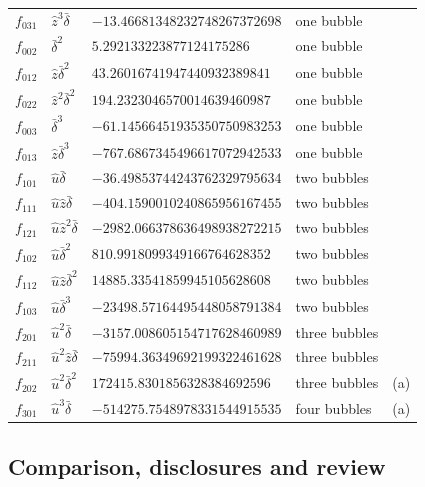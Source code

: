 \documentclass[11pt,a4paper]{article}
\numberwithin{equation}{section}
\newcommand{\db}{\bar\delta}
\begin{document}
{\begin{longtable}{@{}lllll@{}}
$f_{031}$ & $\hat z^3\db$ & $-13.46681348232748267372698$ & one bubble & \\
$f_{002}$ & $\db^2$ & $5.292133223877124175286$ & one bubble & \\
$f_{012}$ & $\hat z\db^2$ & $43.26016741947440932389841$ & one bubble & \\
$f_{022}$ & $\hat z^2\db^2$ & $194.2323046570014639460987$ & one bubble & \\
$f_{003}$ & $\db^3$ & $-61.14566451935350750983253$ & one bubble & \\
$f_{013}$ & $\hat z\db^3$ & $-767.6867345496617072942533$ & one bubble & \\
$f_{101}$ & $\hat u\db$ & $-36.49853744243762329795634$ & two bubbles & \\
$f_{111}$ & $\hat u\hat z\db$ & $-404.1590010240865956167455$ & two bubbles & \\
$f_{121}$ & $\hat u\hat z^2\db$ & $-2982.066378636498938272215$ & two bubbles & \\
$f_{102}$ & $\hat u\db^2$ & $810.9918099349166764628352$ & two bubbles & \\
$f_{112}$ & $\hat u\hat z\db^2$ & $14885.33541859945105628608$ & two bubbles & \\
$f_{103}$ & $\hat u\db^3$ & $-23498.57164495448058791384$ & two bubbles & \\
$f_{201}$ & $\hat u^2\db$ & $-3157.008605154717628460989$ & three bubbles & \\
$f_{211}$ & $\hat u^2\hat z\db$ & $-75994.36349692199322461628$ & three bubbles & \\
$f_{202}$ & $\hat u^2\db^2$ & $172415.8301856328384692596$ & three bubbles & (a)\\
$f_{301}$ & $\hat u^3\db$ & $-514275.7548978331544915535$ & four bubbles & (a)\\
\end{longtable}
}

\subsection{Comparison, disclosures and review}\label{app:integ:disclosures}
\end{document}
